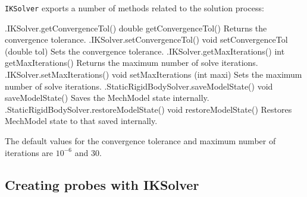 {\tt IKSolver} exports a number of methods related to the solution process:
%
\begin{methodtable}{0.45}{0.55}
\midline
%
\methodentry
{\probes.IKSolver.getConvergenceTol()}%
{double getConvergenceTol()}%
{Returns the convergence tolerance.}%
%
\methodentry
{\probes.IKSolver.setConvergenceTol()}%
{void setConvergenceTol (double tol)}%
{Sets the convergence tolerance.}%
%
\methodentry
{\probes.IKSolver.getMaxIterations()}%
{int getMaxIterations()}%
{Returns the maximum number of solve iterations.}%
%
\methodentry
{\probes.IKSolver.setMaxIterations()}%
{void setMaxIterations (int maxi)}%
{Sets the maximum number of solve iterations.}%
%
\methodentry
{\mech.StaticRigidBodySolver.saveModelState()}%
{void saveModelState()}%
{Saves the MechModel state internally.}%
%
\methodentry
{\mech.StaticRigidBodySolver.restoreModelState()}%
{void restoreModelState()}%
{Restores MechModel state to that saved internally.}%
%
\midline
\end{methodtable}
%
The default values for the convergence tolerance and maximum number of
iterations are $10^{-6}$ and 30.

\subsection{Creating probes with IKSolver}

